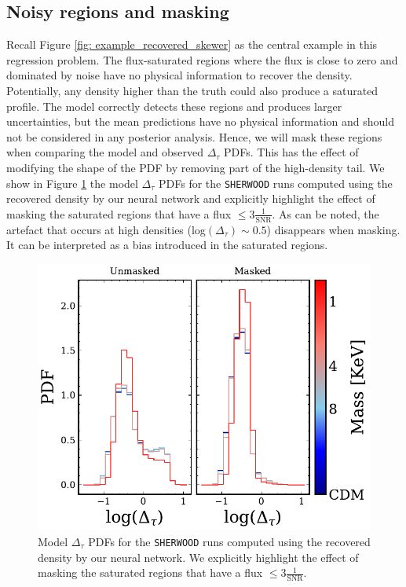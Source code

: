 \subsection{Noisy regions and masking}
Recall Figure \ref{fig: example_recovered_skewer} as the central example in this regression problem. The flux-saturated regions where the flux is close to zero and dominated by noise have no physical information to recover the density. Potentially, any density higher than the truth could also produce a saturated profile. The model correctly detects these regions and produces larger uncertainties, but the mean predictions have no physical information and should not be considered in any posterior analysis. Hence, we will mask these regions when comparing the model and observed $\Delta_\tau$ PDFs. This has the effect of modifying the shape of the PDF by removing part of the high-density tail. We show in Figure \ref{fig: PDF masked unmasked} the model $\Delta_\tau$ PDFs for the \texttt{SHERWOOD} runs computed using the recovered density by our neural network and explicitly highlight the effect of masking the saturated regions that have a flux $\leq 3\frac{1}{\mathrm{SNR}}$. As can be noted, the artefact that occurs at high densities  (log$(\Delta_\tau) \sim 0.5$) disappears when masking. It can be interpreted as a bias introduced in the saturated regions.

\begin{figure}
    \centering
    \includegraphics[width=0.85\linewidth]{img/ML/PDF_masked_unmasked.pdf}
    \caption{Model $\Delta_\tau$ PDFs for the \texttt{SHERWOOD} runs computed using the recovered density by our neural network. We explicitly highlight the effect of masking the saturated regions that have a flux $\leq 3\frac{1}{\mathrm{SNR}}$. }
    \label{fig: PDF masked unmasked}
\end{figure}


